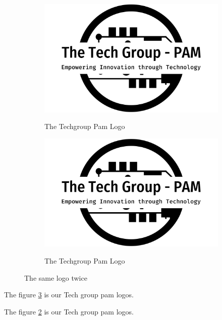 \documentclass{book}
\begin{document}
    \begin{figure}[h!] %
        \begin{subfigure}[b]{0.4\linewidth}
            \caption{The Techgroup Pam Logo}
            \includegraphics[width=\linewidth]{the-tech-group-pam-high-resolution-logo-black-on-transparent-background_01.png}
            \label{labe1}
        \end{subfigure}
        \begin{subfigure}[b]{0.4\linewidth}
            \caption{The Techgroup Pam Logo}
            \includegraphics[width=\linewidth]{the-tech-group-pam-high-resolution-logo-black-on-transparent-background_01.png}
            \label{label2}
        \end{subfigure}
        \caption{The same logo twice}
        \label{fig:logos2}
    \end{figure}

    The figure \ref{fig:logos2} is our Tech group pam logos. 

    \newpage 

    The figure \ref{label2} is our Tech group pam logos. 
\end{document}

